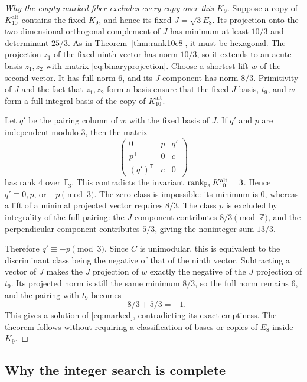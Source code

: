 \documentclass[11pt,a4paper]{article}
\theoremstyle{remark}\newtheorem{remark}[theorem]{Remark}
\newcommand{\Z}{\mathbb Z}\newcommand{\R}{\mathbb R}\newcommand{\F}{\mathbb F}
\newcommand{\Kalt}{K_{10}^{\mathrm{alt}}}
\begin{document}
\begin{proof}[Why the empty marked fiber excludes every copy over this $K_9$]
Suppose a copy of $\Kalt$ contains the fixed $K_9$, and hence its fixed $J=\sqrt3E_8$. Its projection onto the two-dimensional orthogonal complement of $J$ has minimum at least $10/3$ and determinant $25/3$. As in Theorem~\ref{thm:rank10e8}, it must be hexagonal. The projection $z_1$ of the fixed ninth vector has norm $10/3$, so it extends to an acute basis $z_1,z_2$ with matrix \eqref{eq:binaryprojection}. Choose a shortest lift $w$ of the second vector. It has full norm 6, and its $J$ component has norm $8/3$. Primitivity of $J$ and the fact that $z_1,z_2$ form a basis ensure that the fixed $J$ basis, $t_9$, and $w$ form a full integral basis of the copy of $\Kalt$.

Let $q'$ be the pairing column of $w$ with the fixed basis of $J$. If $q'$ and $p$ are independent modulo 3, then the matrix
\[
\begin{pmatrix}0&p&q'\\p^{\mathsf T}&0&c\\(q')^{\mathsf T}&c&0\end{pmatrix}
\]
has rank 4 over $\F_3$. This contradicts the invariant $\rank_{\F_3}\Kalt=3$. Hence $q'\equiv0,p$, or $-p\pmod3$. The zero class is impossible: its minimum is 0, whereas a lift of a minimal projected vector requires $8/3$. The class $p$ is excluded by integrality of the full pairing: the $J$ component contributes $8/3\pmod\Z$, and the perpendicular component contributes $5/3$, giving the noninteger sum $13/3$.

Therefore $q'\equiv-p\pmod3$. Since $C$ is unimodular, this is equivalent to the discriminant class being the negative of that of the ninth vector. Subtracting a vector of $J$ makes the $J$ projection of $w$ exactly the negative of the $J$ projection of $t_9$. Its projected norm is still the same minimum $8/3$, so the full norm remains 6, and the pairing with $t_9$ becomes
\[
-8/3+5/3=-1.
\]
This gives a solution of \eqref{eq:marked}, contradicting its exact emptiness. The theorem follows without requiring a classification of bases or copies of $E_8$ inside $K_9$.
\end{proof}

\subsection{Why the integer search is complete}
\end{document}
